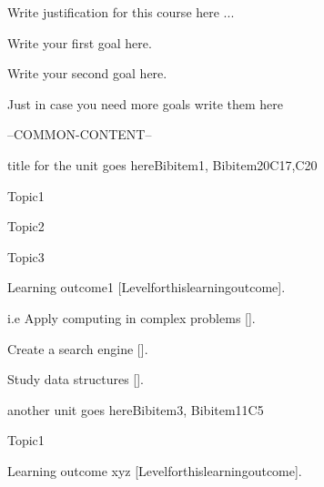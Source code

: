 \begin{syllabus}


\begin{justification}
Write justification for this course here ...
\end{justification}

\begin{goals}
\item Write your first goal here.
\item Write your second goal here.
\item Just in case you need more goals write them here
\end{goals}

--COMMON-CONTENT--

\begin{unit}{title for the unit goes here}{}{Bibitem1, Bibitem2}{0}{C17,C20}
\begin{topics}
      \item Topic1
      \item Topic2
      \item Topic3
\end{topics}

\begin{learningoutcomes}
   \item Learning outcome1 [Levelforthislearningoutcome].
   \item i.e Apply computing in complex problems [\Usage].
   \item Create a search engine [\Assessment].
   \item Study data structures [\Familiarity].
\end{learningoutcomes}
\end{unit}

\begin{unit}{another unit goes here}{}{Bibitem3, Bibitem1}{1}{C5}
\begin{topics}
      \item Topic1
\end{topics}

\begin{learningoutcomes}
      \item Learning outcome xyz [Levelforthislearningoutcome].
\end{learningoutcomes}
\end{unit}

\begin{coursebibliography}
\end{coursebibliography}

\end{syllabus}
